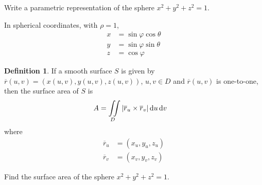 \documentclass[fleqn, a4paper, 12pt, twoside]{article}
\theoremstyle{definition}
\newtheorem{definition}{Definition}
\theoremstyle{theorem}
\begin{document}
{\begin{question}
	Write a parametric representation of the sphere $x^2 + y^2 + z^2 = 1$.
\end{question}

\begin{solution}
	In spherical coordinates, with $\rho = 1$,
	\begin{align*}
		x & = \sin \varphi \cos \theta \\
		y & = \sin \varphi \sin \theta \\
		z & = \cos \varphi
	\end{align*}
\end{solution}

\begin{definition}
	If a smooth surface $S$ is given by $\overline{r}(u,v) = \left( x(u,v) , y(u,v) , z(u,v) \right)$, $u,v \in D$ and $\overline{r}(u,v)$ is one-to-one, then the surface area of $S$ is
	\begin{align*}
		A & = \iint\limits_{D} \left| \overline{r}_u \times \overline{r}_v \right| \dif u \dif v
	\end{align*}
	where
	\begin{align*}
		\overline{r}_u & = (x_u, y_u, z_u) \\
		\overline{r}_v & = (x_v, y_v, z_v)
	\end{align*}
\end{definition}

\begin{question}
	Find the surface area of the sphere $x^2 + y^2 + z^2 = 1$.
\end{question}

}
\end{document}
